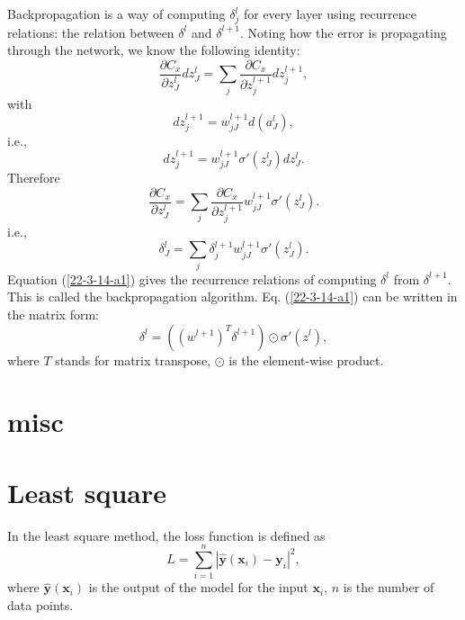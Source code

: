 \documentclass{article}
\begin{document}
Backpropagation is a way of computing $\delta^l_j$ for every layer using
recurrence relations: the relation between $\delta^l$ and $\delta^{l + 1}$.
Noting how the error is propagating through the network, we know the following
identity:
\begin{equation}
  \frac{\partial C_x}{\partial z_J^l} d z^l_J = \sum_j \frac{\partial
  C_x}{\partial z_j^{l + 1}} d z^{l + 1}_j,
\end{equation}
with
\begin{equation}
  d z_j^{l + 1} = w^{l + 1}_{j J} d (a^l_J),
\end{equation}
i.e.,
\begin{equation}
  d z_j^{l + 1} = w^{l + 1}_{j J} \sigma' (z^l_J) d z^l_J .
\end{equation}
Therefore
\begin{equation}
  \frac{\partial C_x}{\partial z_J^l} = \sum_j \frac{\partial C_x}{\partial
  z_j^{l + 1}} w^{l + 1}_{j J} \sigma' (z^l_J) .
\end{equation}
i.e.,
\begin{equation}
  \label{22-3-14-a1} \delta^l_J = \sum_j \delta^{l + 1}_j w^{l + 1}_{j J}
  \sigma' (z^l_J) .
\end{equation}
Equation (\ref{22-3-14-a1}) gives the recurrence relations of computing
$\delta^l$ from $\delta^{l + 1}$. This is called the backpropagation
algorithm. Eq. (\ref{22-3-14-a1}) can be written in the matrix form:
\begin{equation}
  \delta^l = ((w^{l + 1})^T \delta^{l + 1}) \odot \sigma' (z^l),
\end{equation}
where $T$ stands for matrix transpose, $\odot$ is the element-wise product.

\section{misc}

\section{Least square}

In the least square method, the loss function is defined as
\begin{equation}
  L = \sum_{i = 1}^n | \hat{\mathbf{y}} (\mathbf{x}_i) -\mathbf{y}_i |^2,
\end{equation}
where $\hat{\mathbf{y}} (\mathbf{x}_i)$ is the output of the model for the
input $\mathbf{x}_i$, $n$ is the number of data points.
\end{document}

